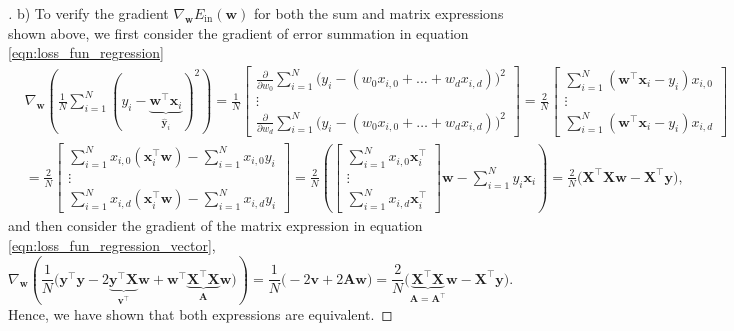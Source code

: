 \documentclass{article}
\newcommand{\mat}[1]{\begin{bmatrix}#1\end{bmatrix}}
\renewcommand{\vec}[1]{\mathbf{#1}}
\begin{document}
    \begin{proof}[\unskip\nopunct]
        b) To verify the gradient $\nabla_\vec{w}E_{\text{in}}(\vec{w})$ for
        both the sum and matrix expressions shown above, we first consider
        the gradient of error summation in equation 
        \eqref{eqn:loss_fun_regression}
        \begin{align*}
            &\nabla_{\vec{w}}\left(\frac{1}{N}\sum_{i=1}^N (y_i - 
            \underbrace{\vec{w}^\top\vec{x}_i}_{\hat{\vec{y}}_i})^2
            \right) = \frac{1}{N}\mat{\frac{\partial}{\partial w_0}
            \sum_{i=1}^N\big(y_i - (w_0x_{i, 0}+\ldots+ w_dx_{i,d})\big)^2 
            \\\vdots\\\frac{\partial}{\partial w_d}\sum_{i=1}^N\big(y_i- 
            (w_0x_{i, 0}+\ldots+w_dx_{i,d})\big)^2} = 
            \frac{2}{N}\mat{\sum_{i=1}^N(\vec{w}^\top\vec{x}_i-y_i)x_{i,0}
            \\\vdots\\\sum_{i=1}^N (\vec{w}^\top\vec{x}_i-y_i)x_{i,d}}\\
            &= \frac{2}{N}\mat{\sum_{i=1}^Nx_{i,0}(\vec{x}_i^\top\vec{w})-
            \sum_{i=1}^Nx_{i,0}y_i\\\vdots\\\sum_{i=1}^Nx_{i,d}(\vec{x}
            _i^\top\vec{w})-\sum_{i=1}^Nx_{i,d}y_i} = \frac{2}{N}\left(
            \mat{\sum_{i=1}^Nx_{i,0}\vec{x}_i^\top\\\vdots\\\sum_{i=1}^N
            x_{i,d}\vec{x}_i^\top}\vec{w}-\sum_{i=1}^Ny_i\vec{x}_i\right) = 
            \frac{2}{N}\big(\vec{X}^\top\vec{X}\vec{w}-\vec{X}^\top\vec{y}
            \big),
        \end{align*}
        and then consider the gradient of the matrix expression in equation 
        \eqref{eqn:loss_fun_regression_vector},
        \[
            \nabla_{\vec{w}}\left(\frac{1}{N}\big(\vec{y}^\top\vec{y} - 
            2\underbrace{\vec{y}^\top \vec{X}}_{\vec{v}^\top}
            \vec{w} + \vec{w}^\top\underbrace{\vec{X}^\top\vec{X}}
            _{\vec{A}}\vec{w}\big)
            \right) = \frac{1}{N}\big(-2\vec{v}+ 2\vec{A}\vec{w}\big) = 
            \frac{2}{N}\big(\underbrace{\vec{X}^\top\vec{X}}_{\vec{A}=\vec{A}
            ^\top}\vec{w} - \vec{X}^\top\vec{y}\big).
        \]
        Hence, we have shown that both expressions are equivalent.
    \end{proof}
\end{document}

